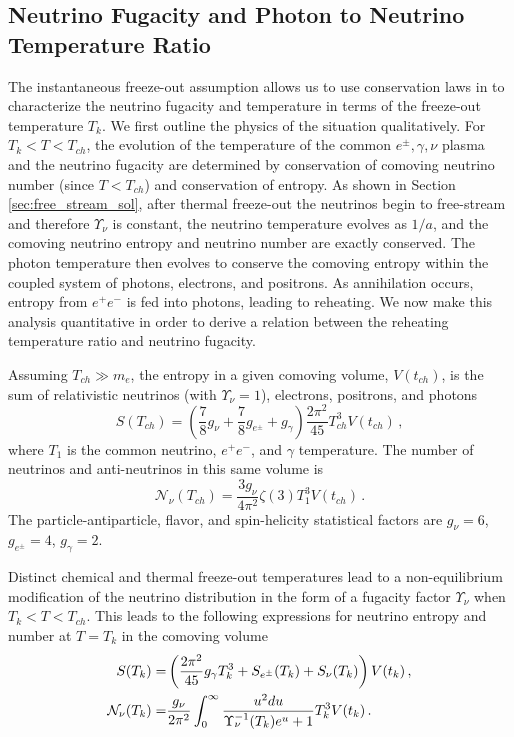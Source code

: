 \subsection{Neutrino Fugacity and Photon to Neutrino Temperature Ratio}\label{Tnugam}
The instantaneous freeze-out assumption allows us to use conservation laws in  to characterize the neutrino fugacity and temperature in terms of the freeze-out temperature $T_k$.  We first outline the physics of the situation qualitatively. For $T_k<T<T_{ch}$, the evolution of the temperature of the common $e^\pm,\gamma,\nu$ plasma and the neutrino fugacity are determined by conservation of comoving neutrino number (since $T<T_{ch}$) and conservation of entropy.    As shown in Section \ref{sec:free_stream_sol}, after thermal freeze-out the neutrinos begin to free-stream and therefore $\Upsilon_\nu$ is constant, the neutrino temperature evolves as $1/a$, and the comoving neutrino entropy and neutrino number are exactly conserved.  The photon temperature then evolves to conserve the comoving entropy within the coupled system of photons, electrons, and positrons.  As annihilation occurs, entropy from $e^+e^-$ is fed into photons, leading to reheating.  We now make this analysis quantitative in order to derive a relation between the reheating temperature ratio and neutrino fugacity.

Assuming $T_{ch}\gg m_e$, the entropy in a given comoving volume, $V(t_{ch})$, is the sum of relativistic neutrinos (with $\Upsilon_\nu=1$), electrons, positrons, and photons
\begin{equation}
S(T_{ch})=\left(\frac{7}{8}g_\nu+\frac{7}{8}g_{e^\pm} +g_\gamma \right)\frac{2\pi^2}{45} T_{ch}^3V(t_{ch})\,,
\end{equation}
where $T_1$ is the common neutrino, $e^+e^-$, and $\gamma$ temperature. The number of neutrinos and anti-neutrinos in this same volume is
\begin{equation}
\mathcal{N}_\nu(T_{ch})=\frac{3g_\nu}{4\pi^2}\zeta(3)T_1^3V(t_{ch})\,.
\end{equation}
The particle-antiparticle, flavor, and spin-helicity statistical factors are $g_\nu=6$, $g_{e^\pm}=4$, $g_\gamma=2$.

Distinct chemical and thermal freeze-out temperatures lead to a non-equilibrium modification of the neutrino distribution in the form of a fugacity factor $\Upsilon_\nu$ when $T_k<T<T_{ch}$.  This leads to the following expressions for neutrino entropy and number at $T=T_k$ in the comoving volume
\begin{align}
S(T_k)=&\left(\frac{2\pi^2}{45}g_\gamma T_k^3+S_{e^\pm}(T_k)+S_{\nu}(T_k)\right)V(t_k)\,,\\
\mathcal{N}_{\nu}(T_k)=&\frac{g_\nu}{2\pi^2}\int_0^\infty \frac{u^2 du}{\Upsilon_\nu^{-1}(T_k)e^u+1}T_k^3V(t_k)\,.\notag
\end{align}


